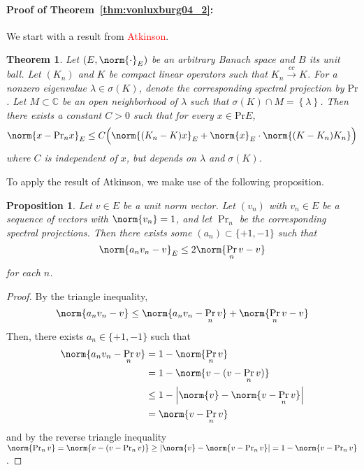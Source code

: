 \documentclass{article}
\newcommand{\abs}[1]{\left \lvert #1 \right \rvert}
\newcommand{\set}[1]{\left\{#1\right\}}
\newcommand{\1}{\mathbf{1}}
\theoremstyle{alden}
\theoremstyle{aldenthm}
\newtheorem{theorem}{Theorem}
\newtheorem{proposition}{Proposition}
\theoremstyle{definition}
\theoremstyle{remark}
\begin{document}
\paragraph{Proof of Theorem~\ref{thm:vonluxburg04_2}:}
We start with a result from \textcolor{red}{Atkinson}.
\begin{theorem}
	\label{thm:atkinson_spectral_perturbation}
	Let $(E,\norm{\cdot}_E)$ be an arbitrary Banach space and $B$ its unit ball. Let $(K_n)$ and $K$ be compact linear operators such that $K_n \overset{cc}{\to} K$. For a nonzero eigenvalue $\lambda \in \sigma(K)$, denote the corresponding spectral projection by $\mathrm{Pr}$. Let $M \subset \mathbb{C}$ be an open neighborhood of $\lambda$ such that $\sigma(K) \cap M = \set{\lambda}$. Then there exists a constant $C > 0$ such that for every $x \in \mathrm{Pr}E$, 
	\begin{equation*}
	\norm{x - \mathrm{Pr}_nx}_{E} \leq C\Bigl( \norm{(K_n - K)x}_{E} + \norm{x}_E \cdot \norm{(K - K_n)K_n} \Bigr)
	\end{equation*}
	where $C$ is independent of $x$, but depends on $\lambda$ and $\sigma(K)$.
\end{theorem}
To apply the result of Atkinson, we make use of the following proposition.
\begin{proposition}
	Let $v \in E$ be a unit norm vector. Let $(v_n)$ with $v_n \in E$ be a sequence of vectors with $\norm{v_n} = 1$, and let $\Pr_n$ be the corresponding spectral projections. Then there exists some $(a_n) \subset \{+1,-1\}$ such that
	\begin{equation*}
	\norm{a_nv_n - v}_E \leq 2\norm{\Pr_nv - v}
	\end{equation*}
	for each $n$.
\end{proposition}
\begin{proof}
	By the triangle inequality,
	\begin{equation*}
	\norm{a_nv_n - v} \leq \norm{a_nv_n - \Pr_nv} + \norm{\Pr_nv - v}
	\end{equation*}
	Then, there exists $a_n \in \{+1,-1\}$ such that
	\begin{align*}
	\norm{a_nv_n - \Pr_nv} & = 1 - \norm{\Pr_nv} \\
	& = 1 - \norm{v - (v - \Pr_nv)} \\
	& \leq 1 - \abs{\norm{v} - \norm{v - \Pr_nv}} \\
	& = \norm{v - \Pr_nv}
	\end{align*}
	and by the reverse triangle inequality $\norm{\Pr_nv} = \norm{v - (v - \Pr_nv)} \geq \abs{\norm{v} - \norm{v - \Pr_nv}} = 1 - \norm{v - \Pr_nv}$. 
\end{proof}
\end{document}
